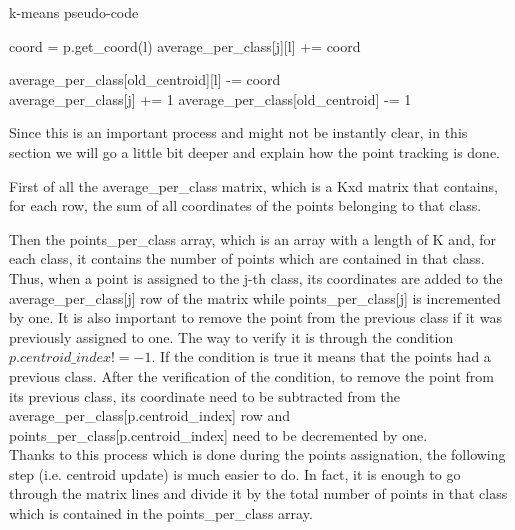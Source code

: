 \documentclass{report}
\begin{document}
\begin{minipage}[b]{0.48\textwidth}
    \begin{algorithm}[H]
        \caption{k-means pseudo-code}\label{alg:cap}
        \begin{algorithmic}
                \State coord = p.get\_coord(l)
                \State average\_per\_class[j][l] += coord

                    \State average\_per\_class[old\_centroid][l] -= coord
                \EndIf
            \EndFor\\

            \State average\_per\_class[j] += 1
                \State average\_per\_class[old\_centroid] -= 1
            \EndIf
        \end{algorithmic}
    \end{algorithm}

    Since this is an important process and might not be instantly clear, in this section we will go a little bit deeper and explain how the point tracking is done.

    First of all the average\_per\_class matrix, which is a Kxd matrix that contains, for each row, the sum of all coordinates of the points belonging to that class.

    Then the points\_per\_class array, which is an array with a length of K and, for each class, it contains the number of points which are contained in that class.\\

    Thus, when a point is assigned to the j-th class, its coordinates are added to the average\_per\_class[j] row of the matrix while points\_per\_class[j] is incremented by one.
    It is also important to remove the point from the previous class if it was previously assigned to one. The way to verify it is through the condition $p.centroid\_index != -1$. If the condition is true it means that the points had a previous class. After the verification of the condition, to remove the point from its previous class, its coordinate need to be subtracted from the average\_per\_class[p.centroid\_index] row and points\_per\_class[p.centroid\_index] need to be decremented by one.\\

    Thanks to this process which is done during the points assignation, the following step (i.e. centroid update) is much easier to do. In fact, it is enough to go through the matrix lines and divide it by the total number of points in that class which is contained in the points\_per\_class array.
\end{minipage}
\end{document}
